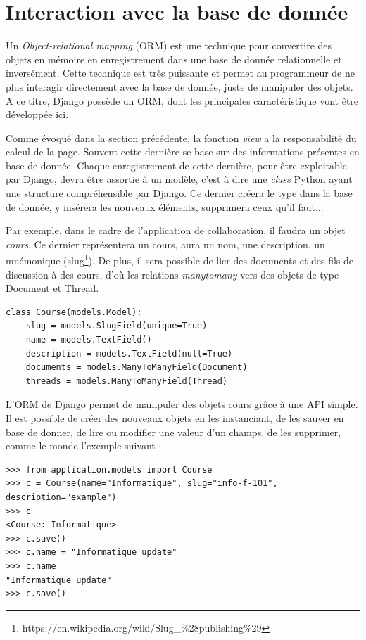 \documentclass[a4paper,12pt]{article}
\begin{document}
\section{Interaction avec la base de donnée}

Un \textit{Object-relational mapping} (ORM) est une technique
pour convertire des objets en mémoire en enregistrement dans une base de donnée
relationnelle et inversément. Cette technique est très puissante et permet
au programmeur de ne plus interagir directement avec la base de donnée, juste
de manipuler des objets. A ce titre, Django possède un ORM, dont les principales
caractéristique vont être développée ici.

Comme évoqué dans la section précédente, la fonction \textit{view} a la responsabilité
du calcul de la page. Souvent cette dernière se base sur des informations présentes
en base de donnée. Chaque enregistrement de cette dernière, pour être exploitable
par Django, devra être assortie à un modèle, c'est à dire une \textit{class} Python
ayant une structure compréhensible par Django. Ce dernier créera le type dans la
base de donnée, y insérera les nouveaux éléments, supprimera ceux qu'il faut...

Par exemple, dans le cadre de l'application de collaboration, il faudra un objet
\textit{cours}. Ce dernier représentera un cours, aura un nom, une description,
un mnémonique (slug\footnote{https://en.wikipedia.org/wiki/Slug\_\%28publishing\%29}).
De plus, il sera possible de lier des documents et des fils de discussion à des
cours, d'où les relations \textit{manytomany} vers des objets de type Document
et Thread.

\begin{verbatim}
class Course(models.Model):
    slug = models.SlugField(unique=True)
    name = models.TextField()
    description = models.TextField(null=True)
    documents = models.ManyToManyField(Document)
    threads = models.ManyToManyField(Thread)
\end{verbatim}

L'ORM de Django permet de manipuler des objets cours grâce à une API simple.
Il est possible de créer des nouveaux objets en les instanciant, de les
sauver en base de donner, de lire ou modifier une valeur d'un champs,
de les supprimer, comme le monde l'exemple suivant :

\begin{verbatim}
>>> from application.models import Course
>>> c = Course(name="Informatique", slug="info-f-101", description="example")
>>> c
<Course: Informatique>
>>> c.save()
>>> c.name = "Informatique update"
>>> c.name
"Informatique update"
>>> c.save()
\end{verbatim}
\end{document}
